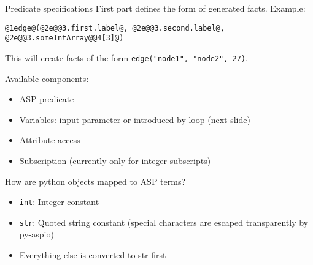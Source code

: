 \documentclass[%
beamer,%
english,%
10pt,%
]{beamer}
\newcommand{\blue}[1]{{\color{blue}#1}}
\newcommand{\red}[1]{{\color{red}#1}}
\newcommand{\orange}[1]{{\color{orange}#1}}
\newcommand{\darkgreen}[1]{{\color{darkgreen}#1}}
\begin{document}
\begin{frame}[fragile]{Predicate specifications}
    First part defines the form of generated facts.
    Example:
    \begin{lstlisting}[escapechar=`,basicstyle=\footnotesize,moredelim={**[is][\color{blue}]{@1}{@}},moredelim={**[is][\color{orange}]{@2}{@}},moredelim={**[is][\color{darkgreen}]{@3}{@}},moredelim={**[is][\color{red}]{@4}{@}}]
    @1edge@(@2e@@3.first.label@, @2e@@3.second.label@, @2e@@3.someIntArray@@4[3]@)
    \end{lstlisting}
    This will create facts of the form \blue{\lstinline{edge("node1", "node2", 27)}}.

    \medskip
    Available components:
    \begin{itemize}
        \item \blue{ASP predicate}
        \item \orange{Variables}: input parameter or introduced by loop (next slide) %
        \item \darkgreen{Attribute access}
        \item \red{Subscription} (currently only for integer subscripts)
    \end{itemize}

    \medskip
    How are python objects mapped to ASP terms?
    \begin{itemize}
        \item \blue{\lstinline{int}}: Integer constant
        \item \blue{\lstinline{str}}: Quoted string constant (special characters are escaped transparently by py-aspio)
        \item Everything else is converted to \blue{str} first
    \end{itemize}
\end{frame}
\end{document}
